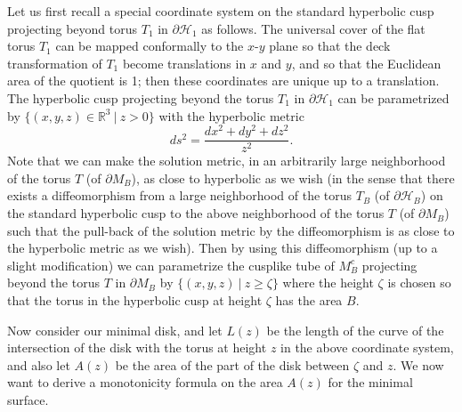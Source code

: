 Let us first recall a special coordinate system on the standard
hyperbolic cusp projecting beyond torus $T_1$ in $\partial
{\mathcal {H}}_1$ as follows. The universal cover of the flat
torus $T_1$ can be mapped conformally to the $x$-$y$ plane so that
the deck transformation of $T_1$ become translations in $x$ and
$y$, and so that the Euclidean area of the quotient is 1; then
these coordinates are unique up to a translation. The hyperbolic
cusp projecting beyond the torus $T_1$ in $\partial {\mathcal
{H}}_1$  can be parametrized by $\{(x,y,z)\in {\mathbb{R}}^3\ |\ z
> 0\}$ with the hyperbolic metric
\begin{equation}
ds^2=\frac{dx^2+dy^2+dz^2}{z^2}. %
\end{equation} Note that we can make the solution metric, in an arbitrarily
large neighborhood of the torus $T$ (of $\partial M_B$), as close
to hyperbolic as we wish (in the sense that there exists a
diffeomorphism from a large neighborhood of the torus $T_B$ (of
$\partial\mathcal{H}_B$) on the standard hyperbolic cusp to the
above neighborhood of the torus $T$ (of $\partial M_B$) such that
the pull-back of the solution metric by the diffeomorphism is as
close to the hyperbolic metric as we wish). Then by using this
diffeomorphism (up to a slight modification) we can parametrize
the cusplike tube of $M_B^c$ projecting beyond the torus $T$ in
$\partial M_B$ by $\{(x,y,z)\ |\  z\geq \zeta\}$ where the height
$\zeta$ is chosen so that the torus in the hyperbolic cusp at
height $\zeta$ has the area $B$.

Now consider our minimal disk, and let $L(z)$ be the length of the
curve of the intersection of the disk with the torus at height $z$
in the above coordinate system, and also let $A(z)$ be the area of
the part of the disk between $\zeta$ and $z$. We now want to
derive a monotonicity formula on the area $A(z)$ for the minimal
surface.


